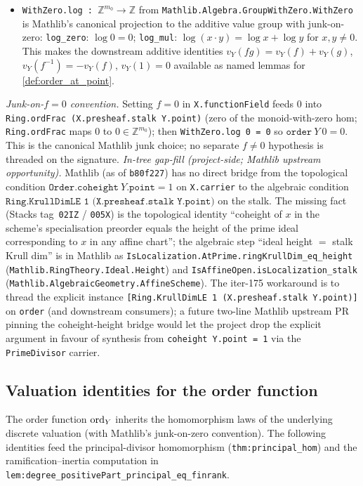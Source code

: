 \begin{definition}
\begin{itemize}
      and from the explicitly threaded
      \texttt{[Ring.KrullDimLE 1 (X.presheaf.stalk Y.point)]}.
    \item \texttt{WithZero.log : \(\mathbb Z^{m_0} \to \mathbb Z\)}
      from \texttt{Mathlib.Algebra.GroupWithZero.WithZero} is Mathlib's
      canonical projection to the additive value group with
      junk-on-zero: \texttt{log\_zero}: \(\log 0 = 0\);
      \texttt{log\_mul}: \(\log(x \cdot y) = \log x + \log y\) for
      \(x, y \neq 0\). This makes the downstream additive identities
      \(v_Y(fg) = v_Y(f) + v_Y(g)\), \(v_Y(f^{-1}) = -v_Y(f)\),
      \(v_Y(1) = 0\) available as named lemmas for
      \ref{def:order_at_point}.
  \end{itemize}
  \emph{Junk-on-\(f = 0\) convention.} Setting \(f = 0\) in
  \texttt{X.functionField} feeds \(0\) into
  \texttt{Ring.ordFrac (X.presheaf.stalk Y.point)} (zero of the
  monoid-with-zero hom; \texttt{Ring.ordFrac} maps \(0\) to
  \(0 \in \mathbb Z^{m_0}\)); then \texttt{WithZero.log 0 = 0} so
  \(\texttt{order}\ Y\ 0 = 0\). This is the canonical Mathlib junk
  choice; no separate \(f \neq 0\) hypothesis is threaded on the
  signature.
  \emph{In-tree gap-fill (project-side; Mathlib upstream opportunity).}
  Mathlib (as of \texttt{b80f227}) has no direct bridge from the
  topological condition \(\texttt{Order.coheight}\ Y.\texttt{point} = 1\)
  on \texttt{X.carrier} to the algebraic condition
  \(\texttt{Ring.KrullDimLE 1 (X.presheaf.stalk Y.point)}\) on the
  stalk. The missing fact (Stacks tag~\texttt{02IZ} / \texttt{005X}) is
  the topological identity ``coheight of \(x\) in the scheme's
  specialisation preorder equals the height of the prime ideal
  corresponding to \(x\) in any affine chart''; the algebraic step
  ``ideal height \(=\) stalk Krull dim'' is in Mathlib as
  \texttt{IsLocalization.AtPrime.ringKrullDim\_eq\_height}
  (\texttt{Mathlib.RingTheory.Ideal.Height}) and
  \texttt{IsAffineOpen.isLocalization\_stalk}
  (\texttt{Mathlib.AlgebraicGeometry.AffineScheme}). The iter-175
  workaround is to thread the explicit instance
  \texttt{[Ring.KrullDimLE 1 (X.presheaf.stalk Y.point)]} on
  \texttt{order} (and downstream consumers); a future two-line
  Mathlib upstream PR pinning the coheight-height bridge would let
  the project drop the explicit argument in favour of synthesis from
  \texttt{coheight Y.point = 1} via the \texttt{PrimeDivisor} carrier.
\end{definition}
\subsection{Valuation identities for the order function}
\label{subsec:order_identities}
The order function \(\operatorname{ord}_Y\) inherits the homomorphism laws of the
underlying discrete valuation (with Mathlib's junk-on-zero convention). The
following identities feed the principal-divisor homomorphism
(\texttt{thm:principal_hom}) and the ramification--inertia computation in
\texttt{lem:degree_positivePart_principal_eq_finrank}.
